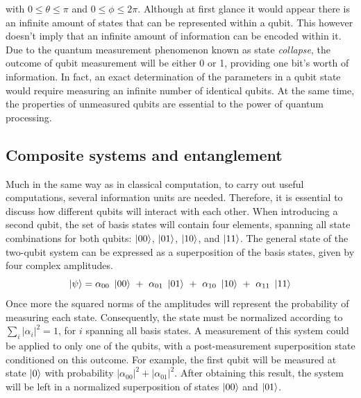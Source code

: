 with $0\leq \theta \leq \pi$ and $0\leq \phi \leq 2\pi$. Although at first glance it would appear there is an infinite amount of states that can be represented within a qubit. This however doesn't imply that an infinite amount of information can be encoded within it. Due to the quantum measurement phenomenon known as state \textit{collapse}, the outcome of qubit measurement will be either 0 or 1, providing one bit's worth of information. In fact, an exact determination of the parameters in a qubit state would require measuring an infinite number of identical qubits. At the same time, the properties of unmeasured qubits are essential to the power of quantum processing\cite{IBMintro,Nielsen2010,Kaye2007,Cleve2021}.

\subsection{Composite systems and entanglement}

Much in the same way as in classical computation, to carry out useful computations, several information units are needed. Therefore, it is essential to discuss how different qubits will interact with each other. When introducing a second qubit, the set of basis states will contain four elements, spanning all state combinations for both qubits: $\ket{00}$, $\ket{01}$, $\ket{10}$, and $\ket{11}$. The general state of the two-qubit system can be expressed as a superposition of the basis states, given by four complex amplitudes.
\begin{equation}
    \ket{\psi} = \alpha_{00}\ \ket{00}\ +\ \alpha_{01}\ \ket{01}\ + \ \alpha_{10}\ \ket{10}\ +\ \alpha_{11}\ \ket{11}
\end{equation}
Once more the squared norms of the amplitudes will represent the probability of measuring each state. Consequently, the state must be normalized according to $\sum_i |\alpha_i|^2 = 1$, for $i$ spanning all basis states. A measurement of this system could be applied to only one of the qubits, with a post-measurement superposition state conditioned on this outcome. For example, the first qubit will be measured at state $\ket{0}$ with probability $|\alpha_{00}|^2 + |\alpha_{01}|^2$. After obtaining this result, the system will be left in a normalized superposition of states $\ket{00}$ and $\ket{01}$.

